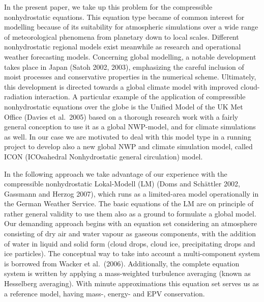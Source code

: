 In the present paper, we take up this problem for the compressible nonhydrostatic equations. This equation type became of common interest for modelling because of its suitability for atmospheric simulations over a wide range of meteorological phenomena from planetary down to local scales. Different nonhydrostatic regional models exist meanwhile as research and operational weather forecasting models.
Concerning global modelling, a notable development takes place in Japan (Satoh 2002, 2003), emphasizing  the careful inclusion of moist processes and conservative properties in the numerical scheme. Ultimately, this development is directed towards a global climate model with improved cloud-radiation interaction. A particular example of the application of compressible nonhydrostatic equations over the globe is the Unified Model of the UK Met Office (Davies et al.~2005) based on a thorough research work with a fairly general conception to use it as a global NWP-model, and for climate simulations as well. In our case we are motivated to deal with this model type in a running project to develop also a new global NWP and climate simulation model, called ICON (ICOsahedral Nonhydrostatic general circulation) model.

In the following approach we take advantage of our experience with the compressible nonhydrostatic Lokal-Modell (LM) (Doms and Sch\"attler 2002, Gassmann and Herzog 2007), which runs as a limited-area model operationally in the German Weather Service. The basic equations of the LM are on principle of rather general validity to use them also as a ground to formulate a global model. Our demanding approach begins with an equation set considering an atmosphere consisting of dry air and water vapour as gaseous components, with the addition of water in liquid and solid form (cloud drops, cloud ice, precipitating drops and ice particles). The conceptual way to take into account a multi-component system is borrowed from Wacker et al.~(2006). Additionally, the complete equation system is written by applying a mass-weighted turbulence averaging (known as Hesselberg averaging). With minute approximations this equation set serves us as a reference model, having mass-, energy- and EPV conservation.

